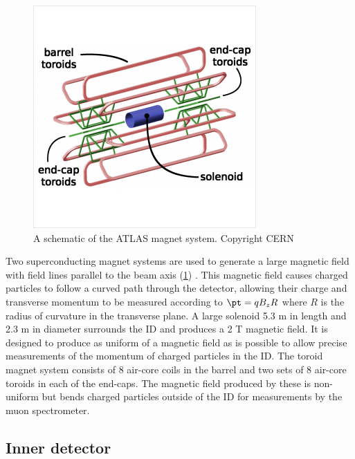 \begin{figure}[t]
\includegraphics{atlas_magnets.png}
\caption{A schematic of the ATLAS magnet system. Copyright CERN}
\label{fig:atlas_magnets}
\end{figure}

Two superconducting magnet systems are used to generate a large magnetic field with field lines parallel to the beam axis (\cref{fig:atlas_magnets}) \cite{ATLAS:1997ae}. %
This magnetic field causes charged particles to follow a curved path through the detector, allowing their charge and transverse momentum to be measured according to \(  \pt = q B_z R\) where $R$ is the radius of curvature in the transverse plane.
A large solenoid 5.3 m in length and 2.3 m in diameter surrounds the ID and produces a 2 T magnetic field.
It is designed to produce as uniform of a magnetic field as is possible to allow precise measurements of the momentum of charged particles in the ID.
The toroid magnet system consists of 8 air-core coils in the barrel and two sets of 8 air-core toroids in each of the end-caps.
The magnetic field produced by these is non-uniform but bends charged particles outside of the ID for measurements by the muon spectrometer.

\subsection{Inner detector}
\label{subsec:atlas_id}

